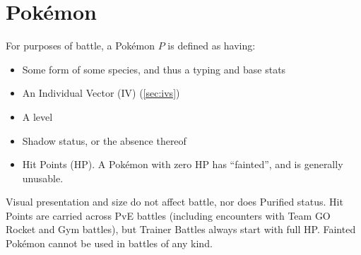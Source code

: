 \chapter{Pokémon}
\label{chap:pokemon}
For purposes of battle, a Pokémon $P$ is defined as having:
\begin{itemize}
\item Some form of some species, and thus a typing and base stats
\item An Individual Vector (IV) (\autoref{sec:ivs})
\item A level
\item Shadow status, or the absence thereof
\item Hit Points (HP). A Pokémon with zero HP has ``fainted'', and is generally unusable.
\end{itemize}
Visual presentation and size do not affect battle, nor does Purified status.
Hit Points are carried across PvE battles (including encounters with
  Team GO Rocket and Gym battles), but Trainer Battles always start with full HP\@.
Fainted Pokémon cannot be used in battles of any kind.

